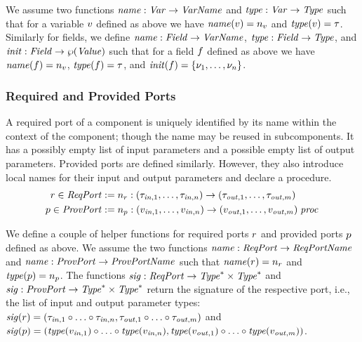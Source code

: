 \documentclass[a4paper,10pt,english]{article}
\begin{document}
We assume two functions $\mathit{name} : \mathit{Var} \rightarrow \mathit{VarName}$ and $\mathit{type} : \mathit{Var} \rightarrow \mathit{Type}$ such that for a variable
$v$ defined as above we have $\mathit{name}(v) = n_v$ and $\mathit{type}(v) = \tau$. Similarly for
fields, we define $\mathit{name} : \mathit{Field} \rightarrow \mathit{VarName}$, $\mathit{type} : \mathit{Field} \rightarrow \mathit{Type}$, and $\mathit{init} : \mathit{Field} \rightarrow
\wp (\mathit{Value})$ such that for a field $f$ defined as above we have $\mathit{name}(f) =
n_v$, $\mathit{type}(f) = \tau$, and $\mathit{init}(f) = \{\nu_1, \ldots, \nu_n\}$.

\subsubsection{Required and Provided Ports}
A required port of a component is uniquely identified by its name within the context of the component; though the name may be
reused in subcomponents. It has a possibly empty list of input parameters and a possible empty list of output parameters. 
Provided ports are defined similarly. However, they also introduce local names for their input and output parameters and declare a
procedure. 
\begin{align*}
	r \in \mathit{ReqPort} &:= n_r \; \mathtt{:} \; \mathtt{(} \tau_{\mathit{in}, 1}, \ldots, \tau_{\mathit{in}, n} \mathtt{) \rightarrow (} \tau_{\mathit{out},1}, \ldots, \tau_{\mathit{out}, m} \mathtt{)} 
	\\
	p \in \mathit{ProvPort} &:= n_p \; \mathtt{:} \; \mathtt{(} v_{\mathit{in}, 1}, \ldots, v_{\mathit{in}, n} \mathtt{) \rightarrow (} v_{\mathit{out}, 1}, \ldots, v_{\mathit{out}, m} \mathtt{)} \; \mathit{proc}
\end{align*}

We define a couple of helper functions for required ports $r$ and provided ports $p$ defined as above. We assume
the two functions $\mathit{name} : \mathit{ReqPort} \rightarrow \mathit{ReqPortName}$ and $\mathit{name} : \mathit{ProvPort} \rightarrow \mathit{ProvPortName}$ such that
$\mathit{name}(r) = n_r$ and $\mathit{type}(p) = n_p$.
The functions $\mathit{sig} :
\mathit{ReqPort} \rightarrow \mathit{Type}^* \times \mathit{Type}^*$ and $\mathit{sig} : \mathit{ProvPort} \rightarrow \mathit{Type}^* \times
\mathit{Type}^*$ return the signature of the respective port, i.e., the list of input and output parameter types:
$\mathit{sig}(r) = (\tau_{\mathit{in}, 1} \circ \ldots \circ \tau_{\mathit{in}, n}, \tau_{\mathit{out}, 1} \circ \ldots
\circ \tau_{\mathit{out}, m})$ and $\mathit{sig}(p) = (\mathit{type}(v_{\mathit{in}, 1}) \circ \ldots \circ
\mathit{type}(v_{\mathit{in}, n}), \mathit{type}(v_{\mathit{out}, 1}) \circ \ldots \circ \mathit{type}(v_{\mathit{out}, m}))$.
\end{document}
